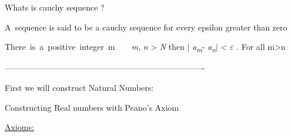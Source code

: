 \documentclass[12pt]{article}
\renewcommand{\_}{\kern-1.5pt\textunderscore\kern-1.5pt}
\begin{document}
\begin{FlushLeft}
Whats is cauchy sequence ?
\end{FlushLeft}\par


\vspace{\baselineskip}
\begin{FlushLeft}
A\ sequence is said to be a cauchy sequence  for every epsilon greater than zero
\end{FlushLeft}\par

\begin{FlushLeft}
There\ is\ a\ positive\ integer\ m\ \ \ \       \textit{m}, \textit{n} > \textit{N} then $ \vert $ \textit{a\textsubscript{m}}- \textit{a\textsubscript{n}}$ \vert $  < \textit{$ \varepsilon $ }. For all m>n
\end{FlushLeft}\par


\vspace{\baselineskip}

\vspace{\baselineskip}

\vspace{\baselineskip}

\vspace{\baselineskip}

\vspace{\baselineskip}
\begin{FlushLeft}
-------------------------------------------------------------------------
\end{FlushLeft}\par


\vspace{\baselineskip}

\vspace{\baselineskip}

\vspace{\baselineskip}
\begin{FlushLeft}
First we will construct Natural Numbers:
\end{FlushLeft}\par


\vspace{\baselineskip}
\begin{FlushLeft}
Constructing Real numbers with Peano’s Axiom
\end{FlushLeft}\par

\begin{FlushLeft}
\uline{Axioms:}
\end{FlushLeft}\par
\end{document}

